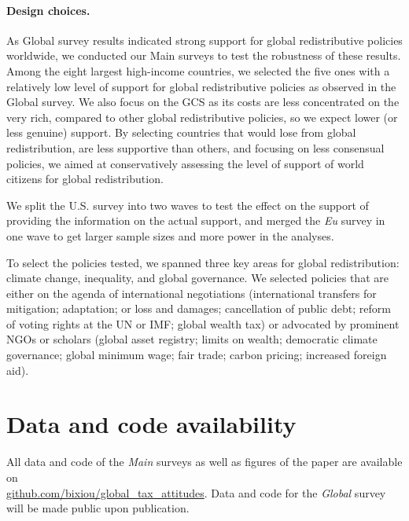\begin{small}
\paragraph{\small Design choices.}

As Global survey results indicated strong support for global redistributive policies worldwide, we conducted our Main surveys to test the robustness of these results. %
Among the eight largest high-income countries, we selected the five ones with a relatively low level of support for global redistributive policies as observed in the Global survey. We also focus on the GCS as its costs are less concentrated on the very rich, compared to other global redistributive policies, so we expect lower (or less genuine) support. By selecting countries that would lose from global redistribution, are less supportive than others, and focusing on less consensual policies, we aimed at conservatively assessing the level of support of world citizens for global redistribution. 

We split the U.S. survey into two waves to test the effect on the support of providing the information on the actual support, and merged the \textit{Eu} survey in one wave to get larger sample sizes and more power in the analyses. 

To select the policies tested, we spanned three key areas for global redistribution: climate change, inequality, and global governance. We selected policies that are either on the agenda of international negotiations (international transfers for mitigation; adaptation; or loss and damages; cancellation of public debt; reform of voting rights at the UN or IMF; global wealth tax) or advocated by prominent NGOs or scholars (global asset registry;\citep{icrict_roadmap_2020} limits on wealth;\citep{robeyns_limitarianism_2024,piketty_brief_2022} democratic climate governance;\citep{dryzek_global_2011} global minimum wage;\citep{palley_financial_2013} fair trade;\citep{hickel_divide_2017} carbon pricing;\citep{cramton_global_2017} increased foreign aid\citep{concord_aid_2019}).



\section*{\normalsize Data and code availability}

All data and code of the \textit{Main} surveys as well as figures of the paper are available on \\ \href{https://github.com/bixiou/international_attitudes_toward_global_policies}{github.com/bixiou/global\_tax\_attitudes}. Data and code for the \textit{Global} survey will be made public upon publication. %

\end{small}  %

